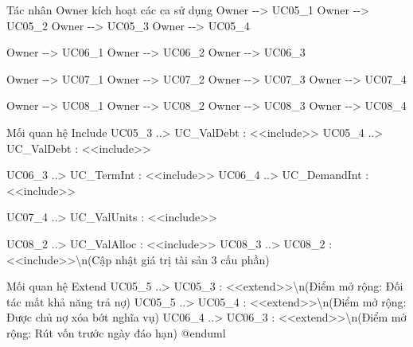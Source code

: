 \documentclass[11pt,a4paper]{article}
\newenvironment{Shaded}{}{}
\newcommand{\NormalTok}[1]{#1}
\begin{document}
\begin{Shaded}
\begin{Highlighting}[]
\NormalTok{\textquotesingle{} Tác nhân Owner kích hoạt các ca sử dụng}
\NormalTok{Owner {-}{-}\textgreater{} UC05\_1}
\NormalTok{Owner {-}{-}\textgreater{} UC05\_2}
\NormalTok{Owner {-}{-}\textgreater{} UC05\_3}
\NormalTok{Owner {-}{-}\textgreater{} UC05\_4}

\NormalTok{Owner {-}{-}\textgreater{} UC06\_1}
\NormalTok{Owner {-}{-}\textgreater{} UC06\_2}
\NormalTok{Owner {-}{-}\textgreater{} UC06\_3}

\NormalTok{Owner {-}{-}\textgreater{} UC07\_1}
\NormalTok{Owner {-}{-}\textgreater{} UC07\_2}
\NormalTok{Owner {-}{-}\textgreater{} UC07\_3}
\NormalTok{Owner {-}{-}\textgreater{} UC07\_4}

\NormalTok{Owner {-}{-}\textgreater{} UC08\_1}
\NormalTok{Owner {-}{-}\textgreater{} UC08\_2}
\NormalTok{Owner {-}{-}\textgreater{} UC08\_3}
\NormalTok{Owner {-}{-}\textgreater{} UC08\_4}

\NormalTok{\textquotesingle{} Mối quan hệ Include}
\NormalTok{UC05\_3 ..\textgreater{} UC\_ValDebt : \textless{}\textless{}include\textgreater{}\textgreater{}}
\NormalTok{UC05\_4 ..\textgreater{} UC\_ValDebt : \textless{}\textless{}include\textgreater{}\textgreater{}}

\NormalTok{UC06\_3 ..\textgreater{} UC\_TermInt : \textless{}\textless{}include\textgreater{}\textgreater{}}
\NormalTok{UC06\_4 ..\textgreater{} UC\_DemandInt : \textless{}\textless{}include\textgreater{}\textgreater{}}

\NormalTok{UC07\_4 ..\textgreater{} UC\_ValUnits : \textless{}\textless{}include\textgreater{}\textgreater{}}

\NormalTok{UC08\_2 ..\textgreater{} UC\_ValAlloc : \textless{}\textless{}include\textgreater{}\textgreater{}}
\NormalTok{UC08\_3 ..\textgreater{} UC08\_2 : \textless{}\textless{}include\textgreater{}\textgreater{}\textbackslash{}n(Cập nhật giá trị tài sản 3 cấu phần)}

\NormalTok{\textquotesingle{} Mối quan hệ Extend}
\NormalTok{UC05\_5 ..\textgreater{} UC05\_3 : \textless{}\textless{}extend\textgreater{}\textgreater{}\textbackslash{}n(Điểm mở rộng: Đối tác mất khả năng trả nợ)}
\NormalTok{UC05\_5 ..\textgreater{} UC05\_4 : \textless{}\textless{}extend\textgreater{}\textgreater{}\textbackslash{}n(Điểm mở rộng: Được chủ nợ xóa bớt nghĩa vụ)}
\NormalTok{UC06\_4 ..\textgreater{} UC06\_3 : \textless{}\textless{}extend\textgreater{}\textgreater{}\textbackslash{}n(Điểm mở rộng: Rút vốn trước ngày đáo hạn)}
\NormalTok{@enduml}
\end{Highlighting}
\end{Shaded}
\fi
\end{document}
